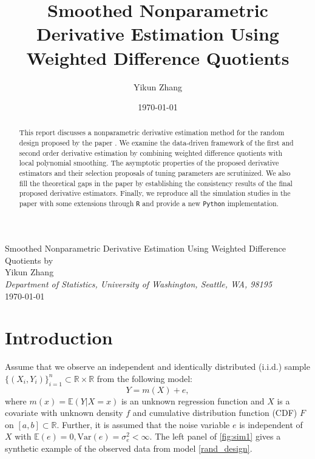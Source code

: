 \documentclass{uwstat572}
\title{Smoothed Nonparametric Derivative Estimation Using Weighted Difference Quotients}
\author{Yikun Zhang}
\date{\today}
\theoremstyle{definition}
\theoremstyle{theorem}
\begin{document}

\begin{center}
  {\LARGE Smoothed Nonparametric Derivative Estimation Using Weighted Difference Quotients by \cite{liu2020smoothed}}\\ \vspace{3mm}
  {Yikun Zhang \\ 
    {\it Department of Statistics, University of Washington, Seattle, WA, 98195}\\
    \today
  }
\end{center}


\begin{abstract}
  This report discusses a nonparametric derivative estimation method for the random design proposed by the paper \citep{liu2020smoothed}. We examine the data-driven framework of the first and second order derivative estimation by combining weighted difference quotients with local polynomial smoothing. The asymptotic properties of the proposed derivative estimators and their selection proposals of tuning parameters are scrutinized. We also fill the theoretical gaps in the paper by establishing the consistency results of the final proposed derivative estimators. Finally, we reproduce all the simulation studies in the paper with some extensions through \texttt{R} and provide a new \texttt{Python} implementation.
\end{abstract}

\section{Introduction}

Assume that we observe an independent and identically distributed (i.i.d.) sample $\{(X_i,Y_i)\}_{i=1}^n \subset \mathbb{R}\times \mathbb{R}$ from the following model:
\begin{equation}
\label{rand_design}
Y = m(X) + e,
\end{equation}
where $m(x)=\mathbb{E}(Y|X=x)$ is an unknown regression function and $X$ is a covariate with unknown density $f$ and cumulative distribution function (CDF) $F$ on $[a,b] \subset \mathbb{R}$. Further, it is assumed that the noise variable $e$ is independent of $X$ with $\mathbb{E}(e)=0, \mathrm{Var}(e)=\sigma_e^2 < \infty$. The left panel of \autoref{fig:sim1} gives a synthetic example of the observed data from model \eqref{rand_design}.
\end{document}
